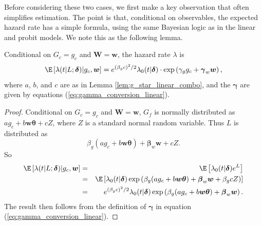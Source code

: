 \documentclass[12pt]{article}
\begin{document}
Before considering these two cases, we first make a key observation that often simplifies estimation. The point is that, conditional on observables, the expected hazard rate has a simple formula, using the same Bayesian logic as in the linear and probit models. We note this as the following lemma.

\begin{lemma}
    \label{lem:expected_hazard_rate}
    Conditional on $G_c = g_c$ and $\boldsymbol W = \boldsymbol w$, the hazard rate $\lambda$ is
    \[
    \E \left[\lambda(t | L ; \boldsymbol \delta) | g_c, \boldsymbol w\right]
    =
    e ^ {(\beta _g c)^2 / 2}
    \lambda_0(t | \boldsymbol \delta) \cdot \exp \left(\gamma_g g_c + \boldsymbol{\gamma}_w \boldsymbol{w} \right)
    \text{,}
    \]
    where $a$, $b$, and $c$ are as in Lemma \ref{lem:g_star_linear_combo}, and the $\boldsymbol{\gamma}$ are given by equations (\ref{eq:gamma_conversion_linear}).
\end{lemma}
\begin{proof}
    Conditional on $G_c = g_c$ and $\boldsymbol W = \boldsymbol w$, $G_f$ is normally distributed as $a g_c + b \boldsymbol w \boldsymbol \theta + cZ$, where $Z$ is a standard normal random variable. Thus $L$ is distributed as
    \[
        \beta_g (a g_c + b \boldsymbol w \boldsymbol \theta)
        +
        \boldsymbol{\beta}_w \boldsymbol w + c Z
        \text{.}
    \]
    So
    \begin{eqnarray*}
        \E \left[\lambda(t | L ; \boldsymbol \delta) | g_c, \boldsymbol w\right]
        &=&
        \E
        \left [
        \lambda_0(t | \boldsymbol \delta) e ^ L
        \right ]
        \\
        &=&
        \E
        \left [
        \lambda_0(t | \boldsymbol \delta)
        \exp\left(
            \beta_g (a g_c + b \boldsymbol w \boldsymbol \theta)
            +
            \boldsymbol{\beta}_w \boldsymbol w + \beta_g c Z
        \right)
        \right ]
        \\
        &=&
        e ^ {(\beta _g c)^2 / 2}
        \lambda_0(t | \boldsymbol \delta)
        \exp\left(
            \beta_g (a g_c + b \boldsymbol w \boldsymbol \theta)
            +
            \boldsymbol{\beta}_w \boldsymbol w
        \right)
        \text{.}
    \end{eqnarray*}
    The result then follows from the definition of $\boldsymbol{\gamma}$ in equation (\ref{eq:gamma_conversion_linear}).
\end{proof}


\end{document}
